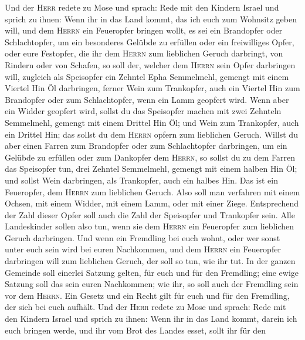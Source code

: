  Und der \textsc{Herr} redete zu Mose und sprach: Rede mit
den Kindern Israel und sprich zu ihnen:  Wenn ihr in das
Land kommt, das ich euch zum Wohnsitz geben will,  und dem
\textsc{Herrn} ein Feueropfer bringen wollt, es sei ein Brandopfer oder
Schlachtopfer, um ein besonderes Gelübde zu erfüllen oder ein
freiwilliges Opfer, oder eure Festopfer, die ihr dem \textsc{Herrn} zum
lieblichen Geruch darbringt, von Rindern oder von Schafen,
 so soll der, welcher dem \textsc{Herrn} sein Opfer
darbringen will, zugleich als Speisopfer ein Zehntel Epha Semmelmehl,
gemengt mit einem Viertel Hin Öl darbringen,  ferner Wein
zum Trankopfer, auch ein Viertel Hin zum Brandopfer oder zum
Schlachtopfer, wenn ein Lamm geopfert wird.  Wenn aber ein
Widder geopfert wird, sollst du das Speisopfer machen mit zwei Zehnteln
Semmelmehl, gemengt mit einem Drittel Hin Öl;  und Wein
zum Trankopfer, auch ein Drittel Hin; das sollst du dem \textsc{Herrn}
opfern zum lieblichen Geruch.  Willst du aber einen Farren
zum Brandopfer oder zum Schlachtopfer darbringen, um ein Gelübde zu
erfüllen oder zum Dankopfer dem \textsc{Herrn},  so sollst
du zu dem Farren das Speisopfer tun, drei Zehntel Semmelmehl, gemengt
mit einem halben Hin Öl;  und sollst Wein darbringen, als
Trankopfer, auch ein halbes Hin. Das ist ein Feueropfer, dem
\textsc{Herrn} zum lieblichen Geruch.  Also soll man
verfahren mit einem Ochsen, mit einem Widder, mit einem Lamm, oder mit
einer Ziege.  Entsprechend der Zahl dieser Opfer soll
auch die Zahl der Speisopfer und Trankopfer sein.  Alle
Landeskinder sollen also tun, wenn sie dem \textsc{Herrn} ein Feueropfer
zum lieblichen Geruch darbringen.  Und wenn ein Fremdling
bei euch wohnt, oder wer sonst unter euch sein wird bei euren
Nachkommen, und dem \textsc{Herrn} ein Feueropfer darbringen will zum
lieblichen Geruch, der soll so tun, wie ihr tut.  In der
ganzen Gemeinde soll einerlei Satzung gelten, für euch und für den
Fremdling; eine ewige Satzung soll das sein euren Nachkommen; wie ihr,
so soll auch der Fremdling sein vor dem \textsc{Herrn}. 
Ein Gesetz und ein Recht gilt für euch und für den Fremdling, der sich
bei euch aufhält.  Und der \textsc{Herr} redete zu Mose
und sprach:  Rede mit den Kindern Israel und sprich zu
ihnen: Wenn ihr in das Land kommt, darein ich euch bringen werde,
 und ihr vom Brot des Landes esset, sollt ihr für den
